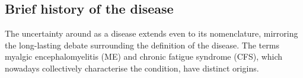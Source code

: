 
\subsection{Brief history of the disease}
\label{subsec:mecfs-history}

The uncertainty around \cfs as a disease extends even to its nomenclature, mirroring the long-lasting debate surrounding the definition of the disease.
The terms myalgic encephalomyelitis (ME) and chronic fatigue syndrome (CFS), which nowadays collectively characterise the condition, have distinct origins.%

